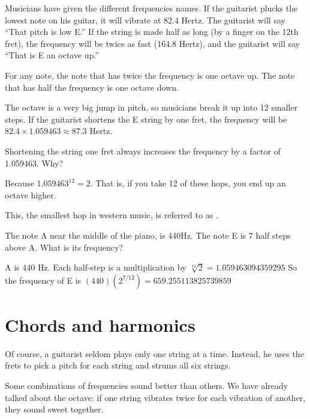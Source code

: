 Musicians have given the different frequencies names. If the guitarist
plucks the lowest note on his guitar, it will vibrate at 82.4
Hertz. The guitarist will say ``That pitch is low E.'' If the string is made
half as long (by a finger on the 12th fret), the frequency will be
twice as fast (164.8 Hertz), and the guitarist will say ``That is E an
octave up.''

For any note, the note that has twice the frequency is one octave
up. The note that has half the frequency is one octave down.

The octave is a very big jump in pitch, so musicians break it up into
12 smaller steps. If the guitarist shortens the E string by one fret,
the frequency will be $82.4 \times 1.059463 \approx 87.3$ Hertz. 

Shortening the string one fret always increases the frequency by a factor of 1.059463. Why?

Because $1.059463^12 = 2$. That is, if you take 12 of these hops, you
end up an octave higher.

This, the smallest hop in western music, is referred to as .

\begin{Exercise}[title={Notes and frequencies}, label=note_to_frequency]

The note A near the middle of the piano, is 440Hz. The note E is 7 half steps above A.  What is its frequency?
 
\end{Exercise}
\begin{Answer}[ref=note_to_frequency]

  A is 440 Hz.  Each half-step is a multiplication by $\sqrt[12]{2} = 1.059463094359295$
  So the frequency of E is $(440)(2^{7/12}) = 659.255113825739859$

\end{Answer}


\section{Chords and harmonics}

Of course, a guitarist seldom plays only one string at a
time. Instead, he uses the frets to pick a pitch for each string and
strums all six strings.

Some combinations of frequencies sound better than others. We have
already talked about the octave: if one string vibrates twice for each
vibration of another, they sound sweet together.

